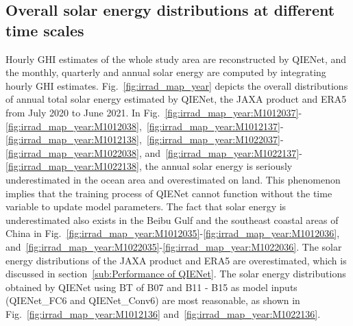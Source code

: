\documentclass[review]{elsarticle}
\begin{document}
\subsection{Overall solar energy distributions at different time scales}
\label{sub:SolarEnergyDistribution}
Hourly GHI estimates of the whole study area are reconstructed by QIENet, and the monthly, quarterly and annual solar energy are computed by integrating hourly GHI estimates.
Fig.~\ref{fig:irrad_map_year} depicts the overall distributions of annual total solar energy estimated by QIENet, the JAXA product and ERA5 from July 2020 to June 2021.
In Fig.~\ref{fig:irrad_map_year:M1012037}-\ref{fig:irrad_map_year:M1012038},~\ref{fig:irrad_map_year:M1012137}-\ref{fig:irrad_map_year:M1012138},~\ref{fig:irrad_map_year:M1022037}-\ref{fig:irrad_map_year:M1022038}, and~\ref{fig:irrad_map_year:M1022137}-\ref{fig:irrad_map_year:M1022138}, the annual solar energy is seriously underestimated in the ocean area and overestimated on land.
This phenomenon implies that the training process of QIENet cannot function without the time variable to update model parameters.
The fact that solar energy is underestimated also exists in the Beibu Gulf and the southeast coastal areas of China in Fig.~\ref{fig:irrad_map_year:M1012035}-\ref{fig:irrad_map_year:M1012036}, and~\ref{fig:irrad_map_year:M1022035}-\ref{fig:irrad_map_year:M1022036}.
The solar energy distributions of the JAXA product and ERA5 are overestimated, which is discussed in section~\ref{sub:Performance of QIENet}.
The solar energy distributions obtained by QIENet using BT of B07 and B11 - B15 as model inputs (QIENet\_FC6 and QIENet\_Conv6) are most reasonable, as shown in Fig.~\ref{fig:irrad_map_year:M1012136} and~\ref{fig:irrad_map_year:M1022136}.
\end{document}
